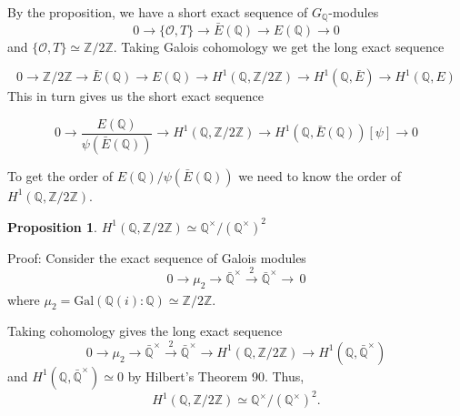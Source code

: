 \documentclass[11pt,a4paper]{amsart}
\theoremstyle{plain}
\newtheorem{prop}{Proposition}[section]
\theoremstyle{definition}
\theoremstyle{remark}
\numberwithin{equation}{section}
\newcommand{\ZZ}{{\mathbb Z}}
\newcommand{\QQ}{{\mathbb Q}}
\newcommand{\OO}{{\mathcal O}}
\newcommand{\1}{{\mathds 1}}
\newcommand{\ra}{\rightarrow}
\begin{document}
By the proposition, we have a short exact sequence of $G_{\QQ}$-modules
\[ 0 \rightarrow \{\OO, T\} \rightarrow \bar{E}(\QQ) \rightarrow E(\QQ)
  \rightarrow 0\]
and $\{\OO, T\} \simeq \ZZ/2\ZZ$. Taking Galois cohomology we get the long
exact sequence

\[ 0 \rightarrow \ZZ / 2\ZZ \rightarrow \bar{E}(\QQ) \rightarrow E(\QQ)
  \rightarrow H^1(\QQ, \ZZ/2\ZZ) \rightarrow H^1(\QQ, \bar{E}) \rightarrow
  H^1(\QQ, E)\]
This in turn gives us the short exact sequence

\[ 0 \rightarrow \frac{E(\QQ)}{\psi(\bar{E} (\QQ))} \rightarrow
  H^1(\QQ, \ZZ / 2\ZZ) \rightarrow H^1(\QQ, \bar{E}(\QQ))[\psi] \rightarrow 0\]

To get the order of $E(\QQ) / \psi(\bar{E}(\QQ))$ we need to know the order of
$H^1(\QQ, \ZZ/2\ZZ)$.

\begin{prop}
  $H^1(\QQ, \ZZ/2\ZZ) \simeq \QQ^{\times} / (\QQ^{\times})^2$
\end{prop}
Proof: Consider the exact sequence of Galois modules
\[0 \rightarrow \mu_2 \rightarrow \bar{\QQ}^{\times} \xrightarrow[]{2} \bar{\QQ}^{\times} \ra
  \, 0 \]
where $\mu_2 = \text{Gal} (\QQ(i) : \QQ) \simeq \ZZ / 2\ZZ.$

Taking cohomology gives the long exact sequence
\[ 0 \ra \mu_2 \ra \bar{\QQ}^{\times} \xrightarrow[]{2} \bar{\QQ}^{\times} \ra H^1(\QQ, \ZZ/2\ZZ)
  \ra H^1(\QQ, \bar{\QQ}^{\times})\]
and $H^1(\QQ, \bar{\QQ}^{\times}) \simeq 0$ by Hilbert's Theorem 90. Thus,
\[H^1(\QQ, \ZZ/2\ZZ) \simeq \QQ^{\times}/(\QQ^{\times})^2. \]



\end{document}
